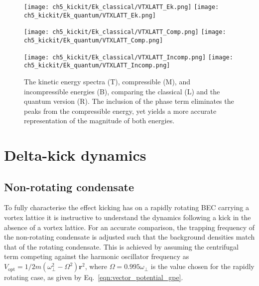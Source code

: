 \begin{figure}
    \centering
    \texttt{[image: ch5\_kickit/Ek\_classical/VTXLATT\_Ek.png]}
    \texttt{[image: ch5\_kickit/Ek\_quantum/VTXLATT\_Ek.png]}

    \texttt{[image: ch5\_kickit/Ek\_classical/VTXLATT\_Comp.png]}
    \texttt{[image: ch5\_kickit/Ek\_quantum/VTXLATT\_Comp.png]}

    \texttt{[image: ch5\_kickit/Ek\_classical/VTXLATT\_Incomp.png]}
    \texttt{[image: ch5\_kickit/Ek\_quantum/VTXLATT\_Incomp.png]}

\caption[Kinetic energy spectra with and without quantum phase.]{The kinetic energy spectra (T), compressible (M), and incompressible energies (B), comparing the classical (L) and the quantum version (R). The inclusion of the phase term eliminates the peaks from the compressible energy, yet yields a more accurate representation of the magnitude of both energies.}
\label{fig:ek_clvqu}
\end{figure}


\section{Delta-kick dynamics}\label{sec:kickvl}
\subsection{Non-rotating condensate}
To fully characterise the effect kicking has on a rapidly rotating BEC carrying a vortex lattice it is instructive to understand the dynamics following a kick in the absence of a vortex lattice. For an accurate comparison, the trapping frequency of the non-rotating condensate is adjusted such that the background densities match that of the rotating condensate. This is achieved by assuming the centrifugal term competing against the harmonic oscillator frequency as $V_{\text{opt}} = 1/2m(\omega^2_\perp - \Omega^2)\mathbf
{r}^2$, where $\Omega=0.995\omega_\perp$ is the value chosen for the rapidly rotating case, as given by Eq.~\eqref{eqn:vector_potential_gpe}.

